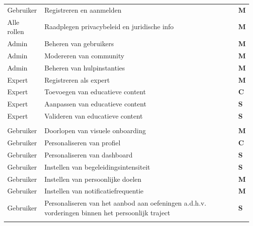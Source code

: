 {\begin{longtable}{
            >{\raggedright\arraybackslash}p{3.0cm}
            >{\raggedright\arraybackslash}p{10.5cm}
            >{\centering\arraybackslash}p{2.0cm}
        }
        \textcolor{gray!40}{Gebruiker} & \textcolor{gray!40}{Registreren en aanmelden} & \textcolor{gray!40}{\textbf{M}} \\
        Alle rollen & Raadplegen privacybeleid en juridische info & \textcolor{green!80!black}{\textbf{M}} \\
        \textcolor{gray!40}{Admin} & \textcolor{gray!40}{Beheren van gebruikers} & \textcolor{gray!40}{\textbf{M}} \\
        \textcolor{gray!40}{Admin} & \textcolor{gray!40}{Modereren van community} & \textcolor{gray!40}{\textbf{M}} \\
        \textcolor{gray!40}{Admin} & \textcolor{gray!40}{Beheren van hulpinstanties} & \textcolor{gray!40}{\textbf{M}} \\
        \textcolor{gray!40}{Expert} & \textcolor{gray!40}{Registreren als expert} & \textcolor{gray!40}{\textbf{M}} \\
        \textcolor{gray!40}{Expert} & \textcolor{gray!40}{Toevoegen van educatieve content} & \textcolor{gray!40}{\textbf{C}} \\
        \textcolor{gray!40}{Expert} & \textcolor{gray!40}{Aanpassen van educatieve content} & \textcolor{gray!40}{\textbf{S}} \\
        \textcolor{gray!40}{Expert} & \textcolor{gray!40}{Valideren van educatieve content} & \textcolor{gray!40}{\textbf{S}} \\ 
        \addlinespace[20pt]
        
        \multicolumn{3}{l}{\textbf{Onboarding \& personalisatie}} \\ \addlinespace[6pt]
        \textcolor{gray!40}{Gebruiker} & \textcolor{gray!40}{Doorlopen van visuele onboarding} & \textcolor{gray!40}{\textbf{M}} \\
        \textcolor{gray!40}{Gebruiker} & \textcolor{gray!40}{Personaliseren van profiel} & \textcolor{gray!40}{\textbf{C}} \\
        \textcolor{gray!40}{Gebruiker} & \textcolor{gray!40}{Personaliseren van dashboard} & \textcolor{gray!40}{\textbf{S}} \\
        \textcolor{gray!40}{Gebruiker} & \textcolor{gray!40}{Instellen van begeleidingsintensiteit} & \textcolor{gray!40}{\textbf{S}} \\
        \textcolor{gray!40}{Gebruiker} & \textcolor{gray!40}{Instellen van persoonlijke doelen} & \textcolor{gray!40}{\textbf{M}} \\
        Gebruiker & Instellen van notificatiefrequentie & \textcolor{green!80!black}{\textbf{M}} \\
        \textcolor{gray!40}{Gebruiker} & \textcolor{gray!40}{Personaliseren van het aanbod aan oefeningen a.d.h.v. vorderingen binnen het persoonlijk traject} & \textcolor{gray!40}{\textbf{S}} \\
        \addlinespace[20pt]
        

\end{longtable}}

